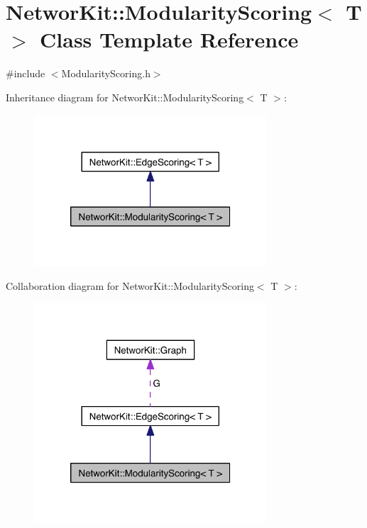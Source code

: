 \hypertarget{class_networ_kit_1_1_modularity_scoring}{\section{Networ\-Kit\-:\-:Modularity\-Scoring$<$ T $>$ Class Template Reference}
\label{class_networ_kit_1_1_modularity_scoring}
}


{\ttfamily \#include $<$Modularity\-Scoring.\-h$>$}



Inheritance diagram for Networ\-Kit\-:\-:Modularity\-Scoring$<$ T $>$\-:\nopagebreak
\begin{figure}[H]
\begin{center}
\leavevmode
\includegraphics[width=246pt]{class_networ_kit_1_1_modularity_scoring__inherit__graph}
\end{center}
\end{figure}


Collaboration diagram for Networ\-Kit\-:\-:Modularity\-Scoring$<$ T $>$\-:\nopagebreak
\begin{figure}[H]
\begin{center}
\leavevmode
\includegraphics[width=246pt]{class_networ_kit_1_1_modularity_scoring__coll__graph}
\end{center}
\end{figure}
